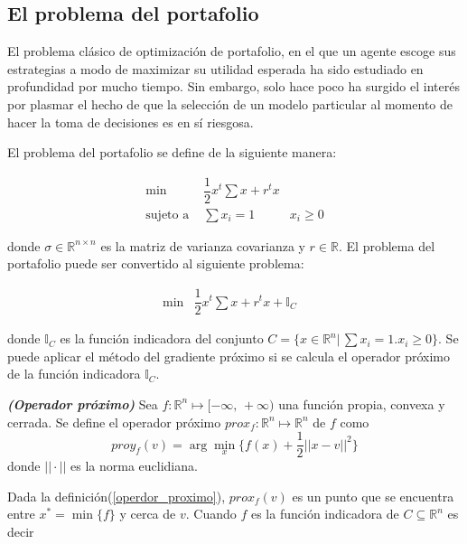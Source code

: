 \subsection{El problema del portafolio \cite{intro}}

El problema cl\'asico de optimizaci\'on de portafolio, en el que un agente escoge sus estrategias a modo de maximizar su utilidad esperada 
ha sido estudiado en profundidad por mucho tiempo. Sin embargo, solo hace poco ha surgido el inter\'es por plasmar el hecho de que la 
selecci\'on de un modelo particular al momento de hacer la toma de decisiones es en s\'i riesgosa.
\medskip

El problema del portafolio se define de la siguiente manera:

\begin{eqnarray*}
   \min & \dfrac{1}{2} x^{t} \sum x +  r^{t} x &  \\
   \mbox{sujeto a } & \sum x_i =1 & x_i \geqslant 0
\end{eqnarray*}

donde $ \sigma \in \mathbb{R}^{n \times n} $ es la matriz de varianza covarianza y $ r \in \mathbb{R}.$ El problema del portafolio puede ser
convertido al siguiente problema:

\begin{eqnarray*}
   \min & \dfrac{1}{2} x^{t} \sum x +  r^{t} x + \mathbb{I}_{C} & 
\end{eqnarray*}

donde $\mathbb{I}_{C}$ es la funci\'on indicadora del conjunto $C = \{x \in \mathbb{R}^{n}|\, \sum x_i = 1. x_i \geqslant 0 \}.$ Se puede
aplicar el m\'etodo del gradiente pr\'oximo si se calcula el operador pr\'oximo de la funci\'on indicadora $\mathbb{I}_{C}.$ 

{ \textbf{\itshape (Operador pr\'oximo)} Sea $f: \mathbb{R}^n \longmapsto [-\infty,\, +\infty)$ una funci\'on propia, convexa y 
cerrada. Se define el operador pr\'oximo $prox_{f}:  \mathbb{R}^n \longmapsto  \mathbb{R}^n $ de $f $ como 
\begin{equation}
   proy_{f}(v) = \arg \min_{x} \{f(x) + \dfrac{1}{2} ||x - v||^2\}
\end{equation}
donde $|| \cdot ||$ es la norma euclidiana. \label{operador_proximo} }~
\medskip

Dada la definici\'on(\ref{operdor_proximo}), $prox_{f}(v) $ es un punto que se encuentra entre $x^* = \min\{f\} $ y cerca de $v.$ Cuando $f$
es la funci\'on indicadora de $C \subseteq \mathbb{R}^n $ es decir

